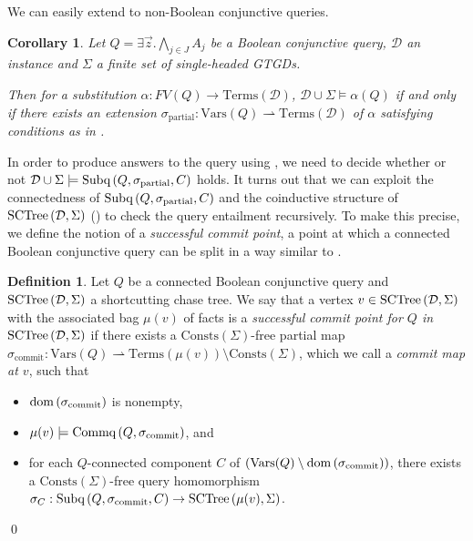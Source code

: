 \documentclass[12pt]{report}
\theoremstyle{plain}
\newtheorem{corollary}[theorem]{Corollary}
\theoremstyle{definition}
\newtheorem{definition}[theorem]{Definition}
\def\Vars{{\mathrm{Vars}}}
\def\Consts{{\mathrm{Consts}}}
\def\Terms{{\mathrm{Terms}}}
\newcommand{\dom}[1]{\ensuremath{\normalfont{\operatorname{dom}} \left( #1 \right)}}
\newcommand{\SCTree}[2]{\ensuremath{\normalfont{\textrm{SCTree}} \left( #1, #2 \right)}}
\newcommand{\Subq}[3]{\ensuremath{\normalfont{\textrm{Subq}} \left( #1, #2, #3 \right)}}
\newcommand{\Commq}[2]{\ensuremath{\normalfont{\textrm{Commq}} \left( #1, #2 \right)}}
\begin{document}
We can easily extend  to non-Boolean conjunctive queries.

\begin{corollary}
\label{base-connected-query-decomposition}
  Let $Q = \exists \vec{z}. \bigwedge_{j \in J} A_j$ be a Boolean conjunctive query, $\mathcal{D}$ an instance and $\Sigma$ a finite set of single-headed GTGDs.
  
  Then for a substitution $\alpha: FV(Q) \rightarrow \Terms(\mathcal{D})$, $\mathcal{D} \cup \Sigma \models \alpha(Q)$ if and only if there exists an extension $\sigma_\mathrm{partial}: \Vars(Q) \rightharpoonup \Terms(\mathcal{D})$ of $\alpha$ satisfying conditions as in .
\end{corollary}


In order to produce answers to the query using , we need to decide whether or not $\mathcal{D} \cup \Sigma \models \Subq{Q}{\sigma_\mathrm{partial}}{C}$ holds. It turns out that we can exploit the connectedness of $\Subq{Q}{\sigma_\mathrm{partial}}{C}$ and the coinductive structure of $\SCTree{\mathcal{D}}{\Sigma}$ () to check the query entailment recursively. To make this precise, we define the notion of a \emph{successful commit point}, a point at which a connected Boolean conjunctive query can be split in a way similar to .

\begin{definition}
\label{successful-commit-point-definition}
  Let $Q$ be a connected Boolean conjunctive query and $\SCTree{\mathcal{D}}{\Sigma}$ a shortcutting chase tree. We say that a vertex $v \in \SCTree{\mathcal{D}}{\Sigma}$ with the associated bag $\mu(v)$ of facts is a \emph{successful commit point for $Q$ in $\SCTree{\mathcal{D}}{\Sigma}$} if there exists a $\Consts(\Sigma)$-free partial map $\sigma_\mathrm{commit}: \Vars(Q) \rightharpoonup \Terms(\mu(v)) \setminus \Consts(\Sigma)$, which we call a \emph{commit map at $v$}, such that
  \begin{itemize}
    \item $\dom{\sigma_\mathrm{commit}}$ is nonempty,
    \item $\mu(v) \models \Commq{Q}{\sigma_\mathrm{commit}}$, and
    \item for each $Q$-connected component $C$ of $(\Vars(Q) \setminus \dom{\sigma_\mathrm{commit}})$, there exists a $\Consts(\Sigma)$-free query homomorphism $\sigma_C: \Subq{Q}{\sigma_\mathrm{commit}}{C} \rightarrow \SCTree{\mu(v)}{\Sigma}$.
  \end{itemize}
  \qed
\end{definition}
\end{document}
